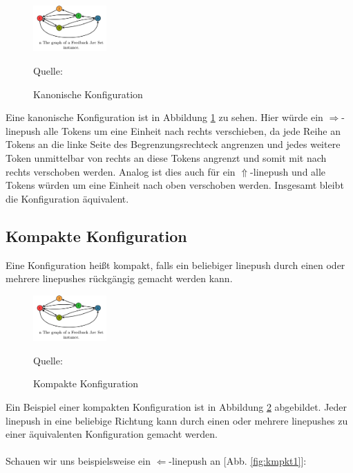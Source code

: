 \documentclass[seminar,german]{algothesis}
\newcommand*{\quelle}{%
  \footnotesize Quelle:
}
\begin{document}
\begin{figure}[ht]
	\centering
	\includegraphics[width=0.25\textwidth]{graph}
	\caption{Kanonische Konfiguration}
	\quelle \cite{akitaya2022pushing}
	\label{fig:3}
\end{figure}

\noindent Eine kanonische Konfiguration ist in Abbildung \ref{fig:3} zu sehen. Hier würde ein $\Rightarrow$-linepush alle Tokens um eine Einheit nach rechts verschieben, da jede Reihe an Tokens an die linke Seite des Begrenzungsrechteck angrenzen und jedes weitere Token unmittelbar von rechts an diese Tokens angrenzt und somit mit nach rechts verschoben werden. Analog ist dies auch für ein $\Uparrow$-linepush und alle Tokens würden um eine Einheit nach oben verschoben werden. Insgesamt bleibt die Konfiguration äquivalent.


\subsection{Kompakte Konfiguration}
\begin{definition}
Eine Konfiguration heißt kompakt, falls ein beliebiger linepush durch einen oder mehrere linepushes rückgängig gemacht werden kann.
\end{definition}
\begin{figure}[ht]
	\centering
	\includegraphics[width=0.25\textwidth]{graph}
	\caption{Kompakte Konfiguration}
	\quelle \cite{akitaya2022pushing}
	\label{fig:4}
\end{figure}
\noindent Ein Beispiel einer kompakten Konfiguration ist in Abbildung \ref{fig:4} abgebildet. Jeder linepush in eine beliebige Richtung kann durch einen oder mehrere linepushes zu einer äquivalenten Konfiguration gemacht werden. \\\\
Schauen wir uns beispielsweise ein $\Leftarrow$-linepush an [Abb. \ref{fig:kmpkt1}]:
\end{document}
